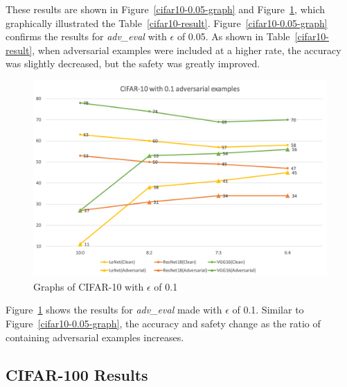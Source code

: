\documentclass[journal,article,submit,moreauthors,pdftex]{Definitions/mdpi}
\begin{document}
These results are shown in Figure~\ref{cifar10-0.05-graph} and Figure~\ref{cifar10-0.1-graph}, which graphically illustrated the Table~\ref{cifar10-result}.
Figure~\ref{cifar10-0.05-graph} confirms the results for {\it adv\_eval} with \begin{math}\epsilon\end{math} of 0.05.
As shown in Table~\ref{cifar10-result}, when adversarial examples were included at a higher rate, the accuracy was slightly decreased, but the safety was greatly improved.

\begin{figure}[H]
    \includegraphics[width=13 cm]{Definitions/graph-01cifar10.png}
    \caption{Graphs of CIFAR-10 with \begin{math}\epsilon\end{math} of 0.1\label{cifar10-0.1-graph}}
\end{figure}

Figure~\ref{cifar10-0.1-graph} shows the results for {\it adv\_eval} made with \begin{math}\epsilon\end{math} of 0.1.
Similar to Figure~\ref{cifar10-0.05-graph}, the accuracy and safety change as the ratio of containing adversarial examples increases.

\subsection{CIFAR-100 Results}
\end{document}
